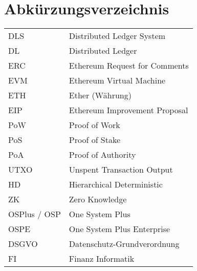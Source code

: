 
\section{Abkürzungsverzeichnis}

\begin{longtable}{p{6 cm}p{9 cm}}
    DLS & Distributed Ledger System \\
    DL & Distributed Ledger \\
    ERC & Ethereum Request for Comments \\
    EVM & Ethereum Virtual Machine \\
    ETH & Ether (Währung) \\
    EIP & Ethereum Improvement Proposal \\
    PoW & Proof of Work \\
    PoS & Proof of Stake \\
    PoA & Proof of Authority \\
    UTXO & Unspent Transaction Output \\
    HD & Hierarchical Deterministic \\
    ZK & Zero Knowledge \\
    OSPlus / OSP & One System Plus \\
    OSPE & One System Plus Enterprise \\
    DSGVO & Datenschutz-Grundverordnung \\
    FI & Finanz Informatik \\
\end{longtable}

   